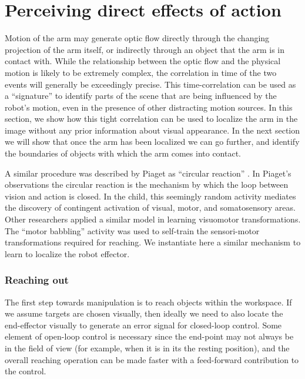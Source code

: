 
\section{Perceiving direct effects of action}
\label{sec:directeffect}

Motion of the arm may generate optic flow directly through the
changing projection of the arm itself, or indirectly through an object
that the arm is in contact with.  While the relationship between the
optic flow and the physical motion is likely to be extremely complex,
the correlation in time of the two events will generally be
exceedingly precise.  This time-correlation can be used as a
``signature'' to identify parts of the scene that are being influenced
by the robot's motion, even in the presence of other distracting
motion sources.  In this section, we show how this tight correlation
can be used to localize the arm in the image without any prior
information about visual appearance.  In the next section we will show
that once the arm has been localized we can go further, and identify
the boundaries of objects with which the arm comes into contact.

\ifrev
A similar procedure was described by Piaget as ``circular reaction'' \cite{piaget63}.
In Piaget's observations the circular reaction is the mechanism by which the loop 
between vision and action is closed. In the child, this seemingly random activity 
mediates the discovery of contingent activation of visual, motor, and somatosensory areas.
Other researchers \cite{bullock-grossberg-guenther-1993} applied a similar model 
in learning visuomotor transformations. The ``motor babbling'' activity was 
used to self-train the sensori-motor transformations required for reaching. 
We instantiate here a similar mechanism to learn to localize the robot effector. 
\fi

\subsubsection*{Reaching out}

The first step towards manipulation is to reach objects within the
workspace.  If we assume targets are chosen visually, then ideally we
need to also locate the end-effector visually to generate an error
signal for closed-loop control.  Some element of open-loop control is
necessary since the end-point may not always be in the field of view
(for example, when it is in its the resting position), and the overall
reaching operation can be made faster with a feed-forward contribution
to the control.

